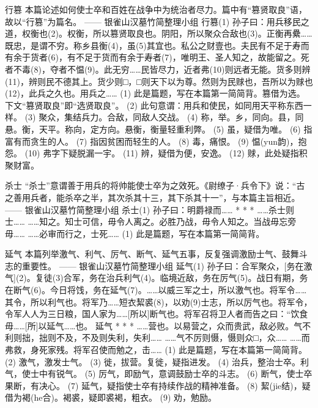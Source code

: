 \documentclass[12pt,UTF8]{ctexbook}
\begin{document}
行篡
本篇论述如何使士卒和百姓在战争中为统治者尽力。篇中有“篡贤取良”语，故以“行篡”为篇名。
—— 银雀山汉墓竹简整理小组
行篡(1)
孙子曰：用兵移民之道，权衡也(2)。权衡，所以篡贤取良也。阴阳，所以聚众合敌也(3)。正衡再纍……既忠，是谓不穷。称乡县衡(4)，虽(5)其宜也。私公之财壹也。夫民有不足于寿而有余于货者(6)，有不足于货而有余于寿者(7)，唯明王、圣人知之，故能留之。死者不毒(8)，夺者不愠(9)。此无穷……民皆尽力，近者弗(10)则远者无能。货多则辨(11)，辨则民不德其上。货少则□，□则天下以为尊。然则为民赇也，吾所以为赇也(12)，此兵之久也。用兵之……
(1) 此是篇题，写在本篇第一简简背。篡借为选。下文“篡贤取良”即“选贤取良”。
(2) 此句意谓：用兵和使民，如同用天平称东西一样。
(3) 聚众，集结兵力。合敌，同敌人交战。
(4) 称，举。乡，同向。县，同悬。衡，天平。称向，定方向。悬衡，衡量轻重利弊。
(5) 虽，疑借为唯。
(6) 指富有而贪生的人。
(7) 指因贫困而轻生的人。
(8) 毒，痛恨。
(9) 愠(yun韵)，抱怨。
(10) 弗字下疑脱漏一宇。
(11) 辨，疑借为便，安逸。
(12) 赇，此处疑指积聚财富。

杀士
“杀士”意谓善于用兵的将帅能使士卒为之效死。《尉缭子·兵令下》说：“古之善用兵者，能杀卒之半，其次杀其十三，其下杀其十一”，与本篇主旨相近。
—— 银雀山汉墓竹简整理小组
杀士(1)
孙子曰：明爵禄而……
* * *
……杀士则士……
……知之。知士可信，毋令人离之。必胜乃战，毋令人知之。当战毋忘旁毋……
……必审而行之，士死……
(1) 此是篇题，写在本篇第一简简背。

延气
本篇列举激气、利气、厉气、断气、延气五事，反复强调激励士气、鼓舞斗志的重要性。
—— 银雀山汉墓竹简整理小组
延气(1)
孙子曰：合军聚众，[务在激气](2)。复徒(3)合军，务在治兵利气(4)。临境近敌，务在厉气(5)。战日有期，务在断气(6)。今日将饯，务在延气(7)。……以威三军之士，所以激气也。将军令……其令，所以利气也。将军乃……短衣絜裘(8)，以劝(9)士志，所以厉气也。将军令，令军人人为三日粮，国人家为……[所以]断气也。将军召将卫人者而告之曰：“饮食毋……[所]以延气……也。
延气
* * *
……营也。以易营之，众而贵武，敌必败。气不利则拙，拙则不及，不及则失利，失利……
……气不厉则慑，慑则众□，众……
……而弗救，身死家残。将军召使而勉之，击……
(1) 此是篇题，写在本篇第一简简背。
(2) 激气，激发士气。
(3) 徙，拔营。复徙，疑指进发。
(4) 治兵，整治士卒。利气，使士中有锐气。
(5) 厉气，即励气，意调鼓励士卒的斗志。
(6) 断气，使士卒果断，有决心。
(7) 延气，疑指使士卒有持续作战的精神准备。
(8) 絜(jie结)，疑借为褐(he合)。褐裘，疑即裘褐，粗衣。
(9) 劝，勉励。
\end{document}
